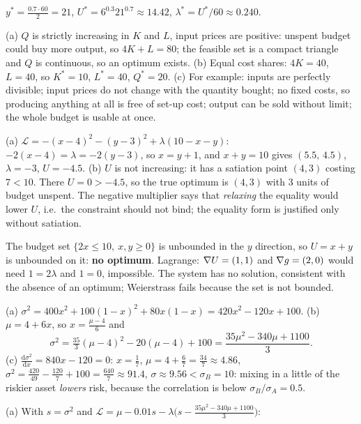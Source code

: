 \begin{solutions}
        $y^*=\tfrac{0.7\cdot60}{2}=21$, $U^*=6^{0.3}21^{0.7}\approx14.42$,
        $\lambda^*=U^*/60\approx0.240$.
  \item (a) $Q$ is strictly increasing in $K$ and $L$, input prices are
        positive: unspent budget could buy more output, so $4K+L=80$; the
        feasible set is a compact triangle and $Q$ is continuous, so an
        optimum exists. (b) Equal cost shares: $4K=40$, $L=40$, so
        $K^*=10$, $L^*=40$, $Q^*=20$. (c) For example: inputs are perfectly
        divisible; input prices do not change with the quantity bought; no
        fixed costs, so producing anything at all is free of set-up cost;
        output can be sold without limit; the whole budget is usable at
        once.
  \item (a) $\mathcal{L}=-(x-4)^{2}-(y-3)^{2}+\lambda(10-x-y)$:
        $-2(x-4)=\lambda=-2(y-3)$, so $x=y+1$, and $x+y=10$ gives
        $(5.5,\,4.5)$, $\lambda=-3$, $U=-4.5$. (b) $U$ is not increasing: it
        has a satiation point $(4,3)$ costing $7<10$. There $U=0>-4.5$, so
        the true optimum is $(4,3)$ with $3$ units of budget unspent. The
        negative multiplier says that \emph{relaxing} the equality would
        lower $U$, i.e.\ the constraint should not bind; the equality form
        is justified only without satiation.
  \item The budget set $\{2x\le10,\ x,y\ge0\}$ is unbounded in the $y$
        direction, so $U=x+y$ is unbounded on it: \textbf{no optimum}.
        Lagrange: $\nabla U=(1,1)$ and $\nabla g=(2,0)$ would need $1=2\lambda$
        and $1=0$, impossible. The system has no solution, consistent with
        the absence of an optimum; Weierstrass fails because the set is not
        bounded.
  \item (a) $\sigma^{2}=400x^{2}+100(1-x)^{2}+80x(1-x)=420x^{2}-120x+100$.
        (b) $\mu=4+6x$, so $x=\tfrac{\mu-4}{6}$ and
        \[
          \sigma^{2}=\tfrac{35}{3}(\mu-4)^{2}-20(\mu-4)+100
          =\frac{35\mu^{2}-340\mu+1100}{3}.
        \]
        (c) $\tfrac{\mathrm{d}\sigma^{2}}{\mathrm{d}x}=840x-120=0$:
        $x=\tfrac17$, $\mu=4+\tfrac67=\tfrac{34}{7}\approx4.86$,
        $\sigma^{2}=\tfrac{420}{49}-\tfrac{120}{7}+100=\tfrac{640}{7}\approx91.4$,
        $\sigma\approx9.56<\sigma_B=10$: mixing in a little of the riskier
        asset \emph{lowers} risk, because the correlation is below
        $\sigma_B/\sigma_A=0.5$.
  \item (a) With $s=\sigma^{2}$ and
        $\mathcal{L}=\mu-0.01s-\lambda\bigl(s-\tfrac{35\mu^{2}-340\mu+1100}{3}\bigr)$:

\end{solutions}
